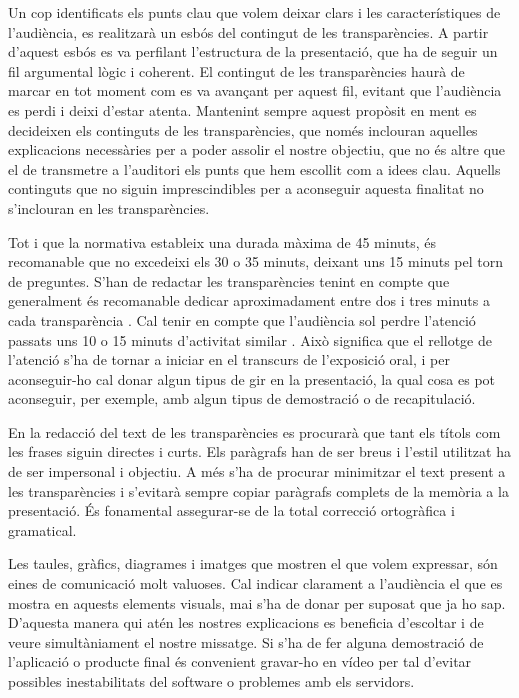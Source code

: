         Un cop identificats els punts clau que volem deixar clars i les característiques de l'audiència, es realitzarà un esbós del contingut de les transparències. A partir d'aquest esbós es va perfilant l'estructura de la presentació, que ha de seguir un fil argumental lògic i coherent. El contingut de les transparències haurà de marcar en tot moment com es va avançant per aquest fil, evitant que l'audiència es perdi i deixi d'estar atenta. Mantenint sempre aquest propòsit en ment es decideixen els continguts de les transparències, que només inclouran aquelles explicacions necessàries per a poder assolir el nostre objectiu, que no és altre que el de transmetre a l'auditori els punts que hem escollit com a idees clau. Aquells continguts que no siguin imprescindibles per a aconseguir aquesta finalitat no s'inclouran en les transparències.

        Tot i que la normativa estableix una durada màxima de 45 minuts, és recomanable que no excedeixi els 30 o 35 minuts, deixant uns 15 minuts pel torn de preguntes. S'han de redactar les transparències tenint en compte que generalment és recomanable dedicar aproximadament entre dos i tres minuts a cada transparència \cite{Padgett08}. Cal tenir en compte que l'audiència sol perdre l'atenció passats uns 10 o 15 minuts d'activitat similar \cite{Padgett08}. Això significa que el rellotge de l'atenció s'ha de tornar a iniciar en el transcurs de l'exposició oral, i per aconseguir-ho cal donar algun tipus de gir en la presentació, la qual cosa es pot aconseguir, per exemple, amb algun tipus de demostració o de recapitulació.

        En la redacció del text de les transparències es procurarà que tant els títols com les frases siguin directes i curts. Els paràgrafs han de ser breus i l'estil utilitzat ha de ser impersonal i objectiu. A més s'ha de procurar minimitzar el text present a les transparències i s'evitarà sempre copiar paràgrafs complets de la memòria a la presentació. És fonamental assegurar-se de la total correcció ortogràfica i gramatical.

        Les taules, gràfics, diagrames i imatges que mostren el que volem expressar, són eines de comunicació molt valuoses. Cal indicar clarament a l'audiència el que es mostra en aquests elements visuals, mai s'ha de donar per suposat que ja ho sap. D'aquesta manera qui atén les nostres explicacions es beneficia d'escoltar i de veure simultàniament el nostre missatge. Si s'ha de fer alguna demostració de l'aplicació o producte final és convenient gravar-ho en vídeo per tal d'evitar possibles inestabilitats del software o problemes amb els servidors.


